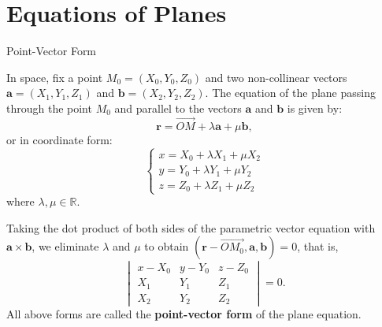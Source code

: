 \documentclass[11pt]{../../TexTemplate/elegantbook} %
\begin{document}
\section{Equations of Planes}
\begin{leftbarTitle}{Point-Vector Form}\end{leftbarTitle}
In space, fix a point \(M_{0} = (X_{0}, Y_{0}, Z_{0})\) and two non-collinear vectors \(\mathbf{a} = (X_{1}, Y_{1}, Z_{1})\) 
and \(\mathbf{b} = (X_{2}, Y_{2}, Z_{2})\).
The equation of the plane passing through the point \(M_{0}\) and 
parallel to the vectors \(\mathbf{a}\) and \(\mathbf{b}\) is given by:
\[
\mathbf{r} = \vec{OM} + \lambda \mathbf{a} + \mu \mathbf{b},
\]
or in coordinate form:
\[
\begin{cases}
x = X_{0} + \lambda X_{1} + \mu X_{2} \\
y = Y_{0} + \lambda Y_{1} + \mu Y_{2} \\
z = Z_{0} + \lambda Z_{1} + \mu Z_{2}
\end{cases}
\]
where \(\lambda, \mu \in \mathbb{R}\).

Taking the dot product of both sides of the parametric vector equation with \(\mathbf{a} \times \mathbf{b}\), 
we eliminate \(\lambda\) and \(\mu\) to obtain \((\mathbf{r} - \vec{OM_{0}}, \mathbf{a}, \mathbf{b}) = 0\), that is,
\begin{equation}\label{eq:PlaneDeterminantForm}
    \begin{vmatrix}
        x - X_{0} & y - Y_{0} & z - Z_{0} \\
        X_{1} & Y_{1} & Z_{1} \\
        X_{2} & Y_{2} & Z_{2}
    \end{vmatrix} = 0.
\end{equation}
All above forms are called the \textbf{point-vector form} of the plane equation.
\vspace{0.7cm}
\end{document}
